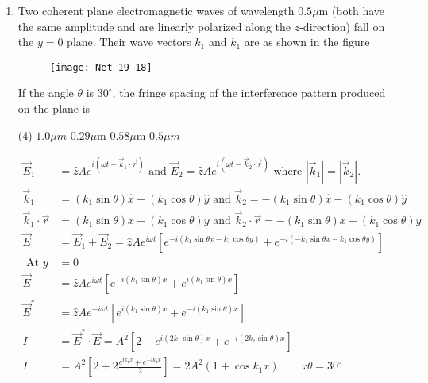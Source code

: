\begin{enumerate}
\begin{answer}
\end{answer}
\item  Two coherent plane electromagnetic waves of wavelength $0.5 \mu \mathrm{m}$ (both have the same amplitude and are linearly polarized along the $z$-direction) fall on the $y=0$ plane. Their wave vectors $k_{1}$ and $k_{1}$ are as shown in the figure
\begin{figure}[H]
	\centering
	\texttt{[image: Net-19-18]}
\end{figure}
If the angle $\theta$ is $30^{\circ}$, the fringe spacing of the interference pattern produced on the plane is
 \begin{tasks}(4)
	\task[\textbf{a.}]$1.0 \mu m$
	\task[\textbf{b.}]$0.29 \mu \mathrm{m}$
	\task[\textbf{c.}]$0.58 \mu \mathrm{m}$
	\task[\textbf{d.}]$0.5 \mu m$ 
\end{tasks}
\begin{answer}
	\begin{align*}
	\vec{E}_{1}&=\hat{z} A e^{i\left(\omega t-\vec{k}_{1} \cdot \vec{r}\right)} \text { and } \vec{E}_{2}=\hat{z} A e^{i\left(\omega t-\vec{k}_{2} \cdot \vec{r}\right)} \text { where }\left|\vec{k}_{1}\right|=\left|\vec{k}_{2}\right| \text {. }\\
	\vec{k}_{1}&=\left(k_{1} \sin \theta\right) \hat{x}-\left(k_{1} \cos \theta\right) \hat{y} \text { and } \vec{k}_{2}=-\left(k_{1} \sin \theta\right) \hat{x}-\left(k_{1} \cos \theta\right) \hat{y}\\
	\vec{k}_{1} \cdot \vec{r}&=\left(k_{1} \sin \theta\right) x-\left(k_{1} \cos \theta\right) y \text { and } \vec{k}_{2} \cdot \vec{r}=-\left(k_{1} \sin \theta\right) x-\left(k_{1} \cos \theta\right) y \\
	\vec{E}&=\vec{E}_{1}+\vec{E}_{2}=\hat{z} A e^{i \omega t}\left[e^{-i\left(k_{1} \sin \theta x-k_{1} \cos \theta y\right)}+e^{-i\left(-k_{1} \sin \theta x-k_{1} \cos \theta y\right)}\right] \\
	\text { At } y&=0 \\
	\vec{E}&=\hat{z} A e^{i \omega t}\left[e^{-i\left(k_{1} \sin \theta\right) x}+e^{i\left(k_{1} \sin \theta\right) x}\right] \\
	\vec{E}^{*}&=\hat{z} A e^{-i \omega t}\left[e^{i\left(k_{1} \sin \theta\right) x}+e^{-i\left(k_{1} \sin \theta\right) x}\right]\\
	I&=\vec{E}^{*} \cdot \vec{E}=A^{2}\left[2+e^{i\left(2 k_{1} \sin \theta\right) x}+e^{-i\left(2 k_{1} \sin \theta\right) x}\right] \\
	I&=A^{2}\left[2+2 \frac{e^{i k_{1} x}+e^{-i k_{1} x}}{2}\right]=2 A^{2}\left(1+\cos k_{1} x\right)\qquad \because \theta=30^{\circ}\\

\end{align*}
\end{answer}
\end{enumerate}
